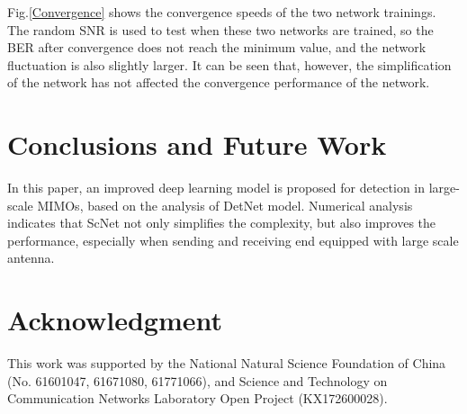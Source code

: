 \documentclass[conference]{IEEEtran}
\begin{document}
Fig.\ref{Convergence} shows the convergence speeds of the two network trainings. The random SNR is used to test when these two networks are trained, so the BER after convergence does not reach the minimum value, and the network fluctuation is also slightly larger. It can be seen that, however, the simplification of the network has not affected the convergence performance of the network.

\section{Conclusions and Future Work}
In this paper, an improved deep learning model is proposed for detection in large-scale MIMOs, based on the analysis of DetNet model. Numerical analysis indicates that ScNet not only simplifies the complexity, but also improves the performance, especially when sending and receiving end equipped with large scale antenna.

\section*{Acknowledgment}
This work was supported by the National Natural Science Foundation of China (No. 61601047, 61671080, 61771066),  and Science and Technology on Communication Networks Laboratory Open Project (KX172600028).
\end{document}
